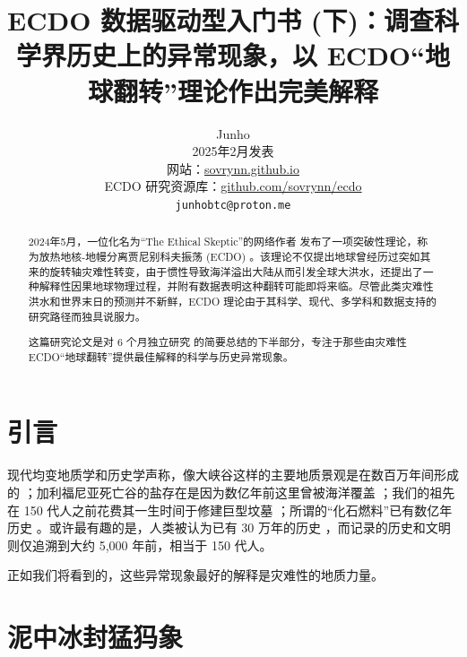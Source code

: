 \documentclass[10pt,twocolumn,letterpaper]{article}
\begin{document}
\title{ECDO 数据驱动型入门书 (下)：调查科学界历史上的异常现象，以 ECDO“地球翻转”理论作出完美解释}

\author{Junho\\
2025年2月发表\\
网站：\href{https://sovrynn.github.io}{sovrynn.github.io}\\
ECDO 研究资源库：\href{https://github.com/sovrynn/ecdo}{github.com/sovrynn/ecdo}\\
{\tt\small junhobtc@proton.me}
}

\maketitle

\begin{abstract}
2024年5月，一位化名为“The Ethical Skeptic”的网络作者 \cite{0} 发布了一项突破性理论，称为放热地核-地幔分离贾尼别科夫振荡 (ECDO) \cite{1}。该理论不仅提出地球曾经历过突如其来的旋转轴灾难性转变，由于惯性导致海洋溢出大陆从而引发全球大洪水，还提出了一种解释性因果地球物理过程，并附有数据表明这种翻转可能即将来临。尽管此类灾难性洪水和世界末日的预测并不新鲜，ECDO 理论由于其科学、现代、多学科和数据支持的研究路径而独具说服力。

这篇研究论文是对 6 个月独立研究 \cite{2,20} 的简要总结的下半部分，专注于那些由灾难性 ECDO“地球翻转”提供最佳解释的科学与历史异常现象。

\end{abstract}


\section{引言}

现代均变地质学和历史学声称，像大峡谷这样的主要地质景观是在数百万年间形成的 \cite{143}；加利福尼亚死亡谷的盐存在是因为数亿年前这里曾被海洋覆盖 \cite{144}；我们的祖先在 150 代人之前花费其一生时间于修建巨型坟墓 \cite{29,70}；所谓的“化石燃料”已有数亿年历史 \cite{104}。或许最有趣的是，人类被认为已有 30 万年的历史 \cite{145}，而记录的历史和文明则仅追溯到大约 5,000 年前，相当于 150 代人。

正如我们将看到的，这些异常现象最好的解释是灾难性的地质力量。

\section{泥中冰封猛犸象}
\end{document}
